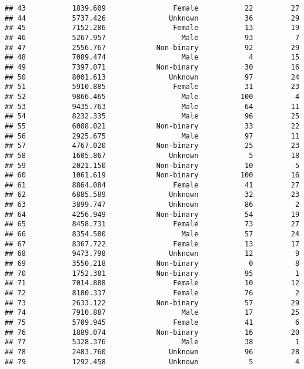 \documentclass[
]{article}
\begin{document}
\begin{verbatim}
## 43           1839.609                Female           22         27
## 44           5737.426               Unknown           36         29
## 45           7152.286                Female           13         19
## 46           5267.957                  Male           93          7
## 47           2556.767            Non-binary           92         29
## 48           7089.474                  Male            4         15
## 49           7397.071            Non-binary           30         16
## 50           8001.613               Unknown           97         24
## 51           5910.885                Female           31         23
## 52           9866.465                  Male          100          4
## 53           9435.763                  Male           64         11
## 54           8232.335                  Male           96         25
## 55           6088.021            Non-binary           33         22
## 56           2925.675                  Male           97         11
## 57           4767.020            Non-binary           25         23
## 58           1605.867               Unknown            5         18
## 59           2021.150            Non-binary           10          5
## 60           1061.619            Non-binary          100         16
## 61           8864.084                Female           41         27
## 62           6885.589               Unknown           32         23
## 63           3899.747               Unknown           86          2
## 64           4256.949            Non-binary           54         19
## 65           8458.731                Female           73         27
## 66           8354.580                  Male           57         24
## 67           8367.722                Female           13         17
## 68           9473.798               Unknown           12          9
## 69           3550.218            Non-binary            0          8
## 70           1752.381            Non-binary           95          1
## 71           7014.888                Female           10         12
## 72           8180.337                Female           76          2
## 73           2633.122            Non-binary           57         29
## 74           7910.887                  Male           17         25
## 75           5709.945                Female           41          6
## 76           1889.074            Non-binary           16         20
## 77           5328.376                  Male           38          1
## 78           2483.760               Unknown           96         28
## 79           1292.458               Unknown            5          4

\end{verbatim}
\end{document}
